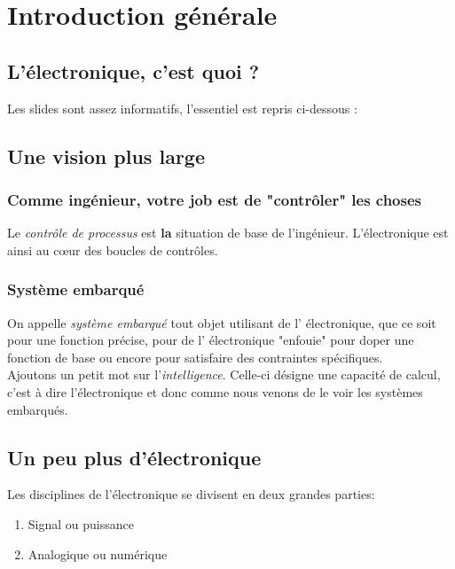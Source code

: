\chapter{Introduction générale}
\section{L'électronique, c'est quoi ?}
Les slides sont assez informatifs, l'essentiel est repris ci-dessous :\\



\section{Une vision plus large}
\subsection{Comme ingénieur, votre job est de "contrôler" les choses}
Le \textit{contrôle de processus} est \textbf{la} situation de base
de l'ingénieur. L'électronique est ainsi au cœur des boucles de 
contrôles.

\subsection{Système embarqué}
On appelle \textit{système embarqué} tout objet utilisant de l'
électronique, que ce soit pour une fonction précise, pour de l'
électronique "enfouie" pour doper une fonction de base ou encore
pour satisfaire des contraintes spécifiques.\\

Ajoutons un petit mot sur l'\textit{intelligence}. Celle-ci désigne
une capacité de calcul, c'est à dire l'électronique et donc comme
nous venons de le voir les systèmes embarqués.


\section{Un peu plus d'électronique}
Les disciplines de l'électronique se divisent en deux grandes parties:
\begin{enumerate}
	\item Signal ou puissance
	\item Analogique ou numérique
\end{enumerate}

